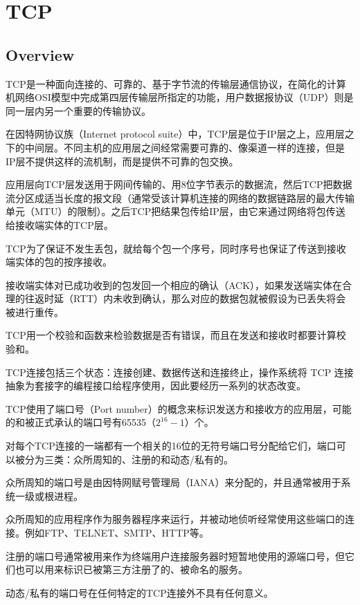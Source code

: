 \chapter{TCP}


\section{Overview}



 TCP是一种面向连接的、可靠的、基于字节流的传输层通信协议，在简化的计算机网络OSI模型中完成第四层传输层所指定的功能，用户数据报协议（UDP）则是同一层内另一个重要的传输协议。
 
 在因特网协议族（Internet protocol suite）中，TCP层是位于IP层之上，应用层之下的中间层。不同主机的应用层之间经常需要可靠的、像渠道一样的连接，但是IP层不提供这样的流机制，而是提供不可靠的包交换。

应用层向TCP层发送用于网间传输的、用8位字节表示的数据流，然后TCP把数据流分区成适当长度的报文段（通常受该计算机连接的网络的数据链路层的最大传输单元（MTU）的限制）。之后TCP把结果包传给IP层，由它来通过网络将包传送给接收端实体的TCP层。

TCP为了保证不发生丢包，就给每个包一个序号，同时序号也保证了传送到接收端实体的包的按序接收。

接收端实体对已成功收到的包发回一个相应的确认（ACK），如果发送端实体在合理的往返时延（RTT）内未收到确认，那么对应的数据包就被假设为已丢失将会被进行重传。

TCP用一个校验和函数来检验数据是否有错误，而且在发送和接收时都要计算校验和。

TCP连接包括三个状态：连接创建、数据传送和连接终止，操作系统将 TCP 连接抽象为套接字的编程接口给程序使用，因此要经历一系列的状态改变。

TCP使用了端口号（Port number）的概念来标识发送方和接收方的应用层，可能的和被正式承认的端口号有65535（$2^{16}-1$）个。


对每个TCP连接的一端都有一个相关的16位的无符号端口号分配给它们，端口可以被分为三类：众所周知的、注册的和动态/私有的。

\begin{compactitem}
\item 众所周知的端口号是由因特网赋号管理局（IANA）来分配的，并且通常被用于系统一级或根进程。

众所周知的应用程序作为服务器程序来运行，并被动地侦听经常使用这些端口的连接。例如FTP、TELNET、SMTP、HTTP等。

\item 注册的端口号通常被用来作为终端用户连接服务器时短暂地使用的源端口号，但它们也可以用来标识已被第三方注册了的、被命名的服务。

\item 动态/私有的端口号在任何特定的TCP连接外不具有任何意义。

\end{compactitem}


